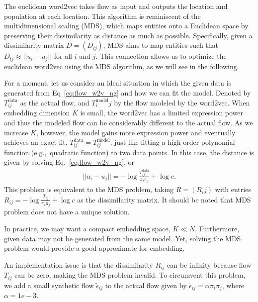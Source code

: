 \documentclass[12pt]{article} %
\def\eg{e.g.,~}
\begin{document}
The euclidean word2vec takes flow as input and outputs the location and population at each location.
This algorithm is reminiscent of the multidimensional scaling (MDS), which maps entities onto a Euclidean space by preserving their dissimilarity as distance as much as possible.
Specifically, given a dissimilarity matrix $D=(D_{ij})$, MDS aims to map entities such that $D_{ij} \approx ||u_i - u_j||$ for all $i$ and $j$.
This connection allows us to optimize the euclidean word2vec using the MDS algorithm, as we will see in the following.

For a moment, let us consider an ideal situation in which the given data is generated from Eq~\eqref{eq:flow_w2v_ng} and how we can fit the model.
Denoted by $T_{ij} ^\text{data}$ as the actual flow, and $T^{\text{model}}_ij$ by the flow modeled by the word2vec.
When embedding dimension $K$ is small, the word2vec has a limited expression power and thus the modeled flow can be considerably different to the actual flow.
As we increase $K$, however, the model gains more expression power and eventually achieves an exact fit, $T_{ij} ^\text{data} = T_{ij} ^\text{model}$, just like fitting a high-order polynomial function (\eg quadratic function) to two data points.
In this case, the distance is given by solving Eq.~\eqref{eq:flow_w2v_ng}, or
\begin{align}
    ||u_i - u_j|| = - \log \frac{T^\text{data}_{ij}}{\pi_i \pi_j} + \log c.
\end{align}
This problem is equivalent to the MDS problem, taking $R=(R_ij)$ with entries $R_{ij}= - \log \frac{T_{ij}}{\pi_i \pi_j} + \log c$ as the dissimilarity matrix.
It should be noted that MDS problem does not have a unique solution.

In practice, we may want a compact embedding space, $K\ll N$.
Furthermore, given data may not be generated from the same model.
Yet, solving the MDS problem would provide a good approximate for embedding.

An implementation issue is that the dissimilarity $R_{ij}$ can be infinity because flow $T_{ij}$ can be zero, making the MDS problem invalid.
To circumvent this problem, we add a small synthetic flow $\tilde \epsilon_{ij}$ to the actual flow given by $\epsilon_{ij} = \alpha \pi_i \pi_j$, where $\alpha = 1e-3$.

\printbibliography{}
\end{document}
